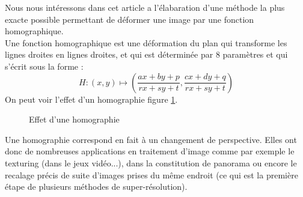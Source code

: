 



	Nous nous intéressons dans cet article a l'élabaration d'une méthode la plus exacte possible permettant de déformer une image par une fonction homographique. \\
 	Une fonction homographique est une déformation du plan qui transforme les lignes droites en lignes droites, et qui est déterminée par 8 paramètres et qui s'écrit sous la forme :
	\[H : (x,y)\mapsto\left( \frac{ax+by+p}{rx+sy+t},\frac{cx+dy+q}{rx+sy+t}\right)\] 
On peut voir l'effet d'un homographie figure \ref{effethom}.\\

 \begin{figure}
 
   \centering
    \arrowPDP 
   \caption{Effet d'une homographie}
\label{effethom}
 \end{figure}

	Une homographie correspond en fait à un changement de perspective. Elles ont donc de nombreuses applications en traitement d'image comme par exemple le texturing (dans le jeux vidéo...), dans la constitution de panorama ou encore le recalage précis de suite d'images prises du même endroit (ce qui est la première étape de plusieurs méthodes de super-résolution).


